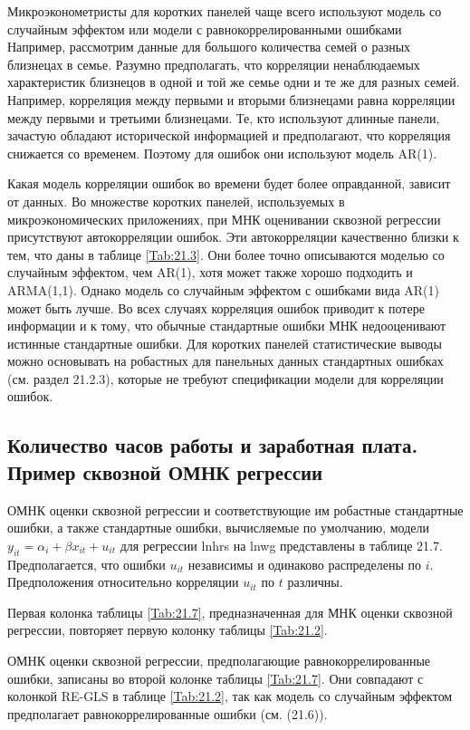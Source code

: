 Микроэконометристы для коротких панелей чаще всего используют модель со случайным эффектом или модели с равнокоррелированными ошибками Например, рассмотрим данные для большого количества семей о разных близнецах в семье. Разумно предполагать, что корреляции ненаблюдаемых характеристик близнецов в одной и той же семье одни и те же для разных семей. Например, корреляция между первыми и вторыми близнецами равна корреляции между первыми и третьими близнецами. Те, кто используют длинные панели, зачастую обладают исторической информацией и предполагают, что корреляция снижается со временем. Поэтому для ошибок они используют модель AR(1). 

Какая модель корреляции ошибок во времени будет более оправданной, зависит от данных. Во множестве коротких панелей, используемых в микроэкономических приложениях, при МНК оценивании сквозной регрессии присутствуют автокорреляции ошибок. Эти автокорреляции качественно близки к тем, что даны в таблице \ref{Tab:21.3}. Они более точно описываются моделью со случайным эффектом, чем AR(1), хотя может также хорошо подходить и ARMA(1,1). Однако модель со случайным эффектом с ошибками вида AR(1) может быть лучше. Во всех случаях корреляция ошибок приводит к потере информации и к тому, что обычные стандартные ошибки МНК недооценивают истинные стандартные ошибки. Для коротких панелей статистические выводы можно основывать на робастных для панельных данных стандартных ошибках (см. раздел 21.2.3), которые не требуют спецификации модели для корреляции ошибок.

\subsection{Количество часов работы и заработная плата. Пример сквозной ОМНК регрессии}

ОМНК оценки сквозной регрессии и соответствующие им робастные стандартные ошибки, а также стандартные ошибки, вычисляемые по умолчанию, модели $y_{it}=\alpha_i+\beta x_{it} + u_{it}$ для регрессии lnhrs на lnwg представлены в таблице 21.7. Предполагается, что ошибки $u_{it}$ независимы и одинаково распределены по $i$. Предположения относительно корреляции $u_{it}$ по $t$ различны.

Первая колонка таблицы \ref{Tab:21.7}, предназначенная для МНК оценки сквозной регрессии, повторяет первую колонку таблицы \ref{Tab:21.2}.

ОМНК оценки сквозной регрессии, предполагающие равнокоррелированные ошибки, записаны во второй колонке таблицы \ref{Tab:21.7}. Они совпадают с колонкой RE-GLS в таблице \ref{Tab:21.2}, так как модель со случайным эффектом предполагает равнокоррелированные ошибки (см. (21.6)).

